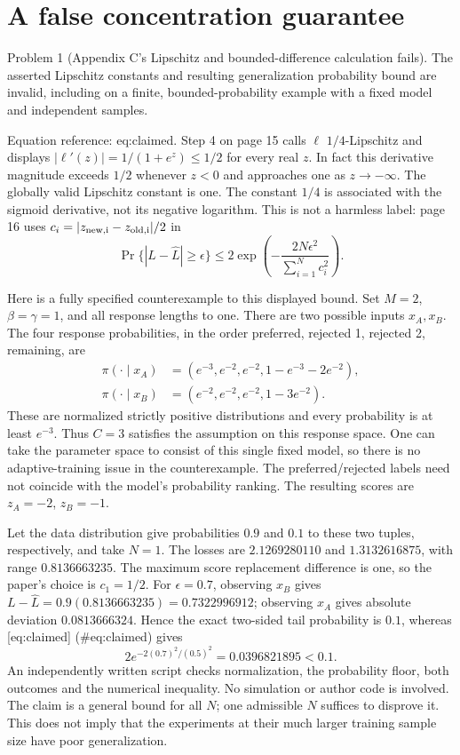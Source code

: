 \documentclass[10pt]{article}
\begin{document}
\section*{A false concentration guarantee}
Problem 1 (Appendix C’s Lipschitz and bounded-difference calculation fails).  The asserted Lipschitz constants and resulting generalization probability bound are invalid, including on a finite, bounded-probability example with a fixed model and independent samples.\par
Equation reference: eq:claimed. Step 4 on page 15 calls \(\ell\) \(1/4\)-Lipschitz and displays \(|\ell'(z)|=1/(1+e^z)\leq1/2\) for every real \(z\). In fact this derivative magnitude exceeds \(1/2\) whenever \(z<0\) and approaches one as \(z\to-\infty\). The globally valid Lipschitz constant is one. The constant \(1/4\) is associated with the sigmoid derivative, not its negative logarithm. This is not a harmless label: page 16 uses \(c_i=|z_{\rm new,i}-z_{\rm old,i}|/2\) in \[\Pr\{|L-\widehat L|\geq\epsilon\}\leq
2\exp\left(-\frac{2N\epsilon^2}{\sum_{i=1}^N c_i^2}\right).\]\par
Here is a fully specified counterexample to this displayed bound. Set \(M=2\), \(\beta=\gamma=1\), and all response lengths to one. There are two possible inputs \(x_A,x_B\). The four response probabilities, in the order preferred, rejected 1, rejected 2, remaining, are \[\begin{aligned}
\pi(\cdot\mid x_A)&=(e^{-3},e^{-2},e^{-2},1-e^{-3}-2e^{-2}),\\
\pi(\cdot\mid x_B)&=(e^{-2},e^{-2},e^{-2},1-3e^{-2}).\end{aligned}\] These are normalized strictly positive distributions and every probability is at least \(e^{-3}\). Thus \(C=3\) satisfies the assumption on this response space. One can take the parameter space to consist of this single fixed model, so there is no adaptive-training issue in the counterexample. The preferred/rejected labels need not coincide with the model’s probability ranking. The resulting scores are \(z_A=-2\), \(z_B=-1\).\par
Let the data distribution give probabilities \(0.9\) and \(0.1\) to these two tuples, respectively, and take \(N=1\). The losses are \(2.1269280110\) and \(1.3132616875\), with range \(0.8136663235\). The maximum score replacement difference is one, so the paper’s choice is \(c_1=1/2\). For \(\epsilon=0.7\), observing \(x_B\) gives \(L-\widehat L=0.9(0.8136663235)=0.7322996912\); observing \(x_A\) gives absolute deviation \(0.0813666324\). Hence the exact two-sided tail probability is \(0.1\), whereas [eq:claimed] (\#eq:claimed) gives \[2e^{-2(0.7)^2/(0.5)^2}=0.0396821895<0.1.\] An independently written script checks normalization, the probability floor, both outcomes and the numerical inequality. No simulation or author code is involved. The claim is a general bound for all \(N\); one admissible \(N\) suffices to disprove it. This does not imply that the experiments at their much larger training sample size have poor generalization.\par
\end{document}
